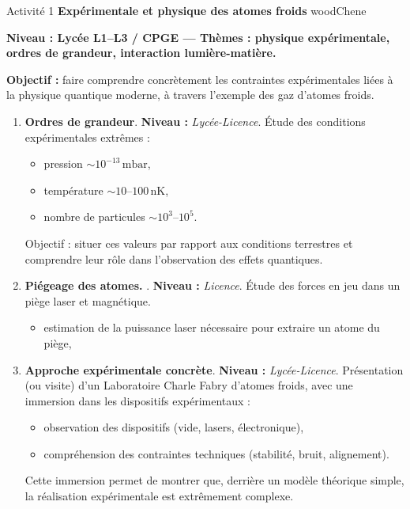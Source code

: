 \EncadreDeux
{Activité 1}
{{\bf \textsf{Expérimentale et physique des atomes froids}}}
{woodChene}
{
    \textbf{Niveau : Lycée L1–L3 / CPGE — Thèmes : physique expérimentale, ordres de grandeur, interaction lumière-matière.}

    \textbf{Objectif :} faire comprendre concrètement les contraintes expérimentales
    liées à la physique quantique moderne, à travers l’exemple des gaz d’atomes froids.

    \begin{enumerate}[label =\textbf{\arabic*.}, ref=\arabic*]

        \item {\bf \textsf{Ordres de grandeur}}. {\bf \textsf{Niveau :}} {\em Lycée-Licence}.
              Étude des conditions expérimentales extrêmes :
              \begin{itemize}
                  \item pression $\sim 10^{-13}\,\mathrm{mbar}$,
                  \item température $\sim 10$--$100\,\mathrm{nK}$,
                  \item nombre de particules $\sim 10^3$--$10^5$.
              \end{itemize}
              Objectif : situer ces valeurs par rapport aux conditions terrestres et
              comprendre leur rôle dans l’observation des effets quantiques.

        \item {\bf \textsf{Piégeage des atomes.}} . {\bf \textsf{Niveau :}} {\em Licence}.
              Étude des forces en jeu dans un piège laser et magnétique.
              \begin{itemize}
                  \item estimation de la puissance laser nécessaire pour extraire un atome du piège,
              \end{itemize}

        \item {\bf \textsf{Approche expérimentale concrète}}. {\bf \textsf{Niveau :}} {\em Lycée-Licence}.
              Présentation (ou visite) d’un Laboratoire Charle Fabry d’atomes froids, avec une immersion dans les dispositifs expérimentaux :
              \begin{itemize}
                  \item observation des dispositifs (vide, lasers, électronique),
                  \item compréhension des contraintes techniques (stabilité, bruit, alignement).
              \end{itemize}
              Cette immersion permet de montrer que, derrière un modèle théorique simple,
              la réalisation expérimentale est extrêmement complexe.


\end{enumerate}}
